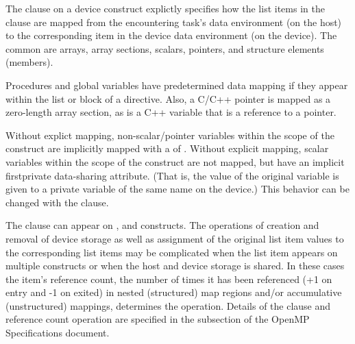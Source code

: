 The  clause on a device construct explictly specifies how the list items in
the clause are mapped from the encountering task's data environment (on the host)
to the corresponding item in the device data environment (on the device).
The common  are arrays, array sections, scalars, pointers, and
structure elements (members). 

Procedures and global variables have predetermined data mapping if they appear
within the list or block of a  directive. Also, a C/C++ pointer
is mapped as a zero-length array section, as is a C++ variable that is a reference to a pointer.

Without explict mapping, non-scalar/pointer variables within the scope of the 
construct are implicitly mapped with a  of .
Without explicit mapping, scalar variables within the scope of the 
construct are not mapped, but have an implicit firstprivate data-sharing
attribute. (That is, the value of the original variable is given to a private
variable of the same name on the device.) This behavior can be changed with
the  clause.

The  clause can appear on ,  and 
 constructs.  The operations of creation and
removal of device storage as well as assignment of the original list item 
values to the corresponding list items may be complicated when the list 
item appears on multiple constructs or when the host and device storage 
is shared. In these cases the item's reference count, the number of times
it has been referenced (+1 on entry and -1 on exited) in nested (structured)
map regions and/or accumulative (unstructured) mappings, determines the operation.
Details of the  clause and reference count operation are specified 
in the  subsection of the OpenMP Specifications document.

